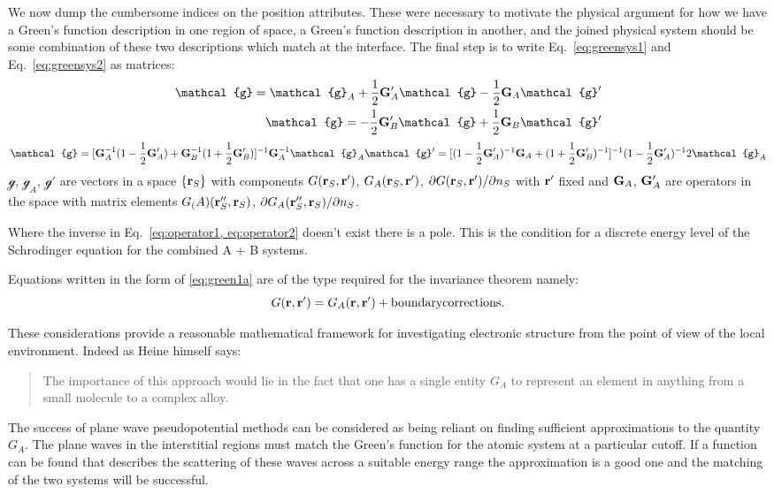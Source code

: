 \documentclass{article}
\def\G{{\bf G}}
\def\r{{\bf r}}
\def\g{\mathcal{g}}
\begin{document}
We now dump the cumbersome indices on the position attributes. These
were necessary to motivate the physical argument for how we have a Green's function
description in one region of space, a Green's function description in another, 
and the joined physical system should be some combination of these two descriptions
which match at the interface. The final step is to write Eq.~\ref{eq:greensys1} 
and Eq.~\ref{eq:greensys2} as matrices:
%
\begin{eqnarray}
\label{eq:operator1}
\g = \g_{A} + \frac{1}{2}\G'_{A}\g - \frac{1}{2}\G_{A}\g' \\
\g = -\frac{1}{2}\G'_{B}\g + \frac{1}{2}\G_{B}\g' \\
\end{eqnarray}
%
\begin{eqnarray}
\label{eq:operator2}
\g = [\G^{-1}_{A}(1-\frac{1}{2}\G'_{A}) + \G^{-1}_{B}(1+\frac{1}{2}\G'_{B})]^{-1} \G^{-1}_{A}\g_{A}
\g'= [(1-\frac{1}{2}\G'_{A})^{-1}\G_{A} + (1+\frac{1}{2}\G'_{B})^{-1}]^{-1}(1 - \frac{1}{2}\G'_{A})^{-1}2\g_{A}
\end{eqnarray}
%
$\g$, $\g_{A}$, $\g'$ are vectors in a space $\{\r_{S}\}$ with components $G(\r_{S},\r')$,
$G_{A}(\r_{S},\r')$, $\partial G(\r_{S},\r')/\partial n_{S}$ with $\r'$ fixed and
$\G_{A}$, $\G'_{A}$ are operators in the space with matrix elements
$G_(A)(\r''_{S}, \r_{S})$, $\partial G_{A}(\r''_{S}, \r_{S})/\partial n_{S}$.

Where the inverse in Eq.~\ref{eq:operator1, eq:operator2} 
doesn't exist there is a pole. This is the condition for a discrete energy level 
of the Schrodinger equation for the combined A + B systems. 

Equations written in the form of \ref{eq:green1a} are of the type required for the invariance theorem namely:
%
\begin{equation}
G(\r,\r') = G_{A}(\r,\r') + {\rm boundary corrections}.
\end{equation}
%

These considerations provide a reasonable mathematical framework for 
investigating electronic structure from the point of view of the local environment.
Indeed as Heine himself says: 

\begin{quote}
The importance of this approach would lie in the fact that
one has a single entity $G_{A}$ to represent an element in anything 
from a small molecule to a complex alloy.
\end{quote}

The success of plane wave pseudopotential methods can be considered as being reliant
on finding sufficient approximations to the quantity $G_{A}$. The plane waves
in the interstitial regions must match the Green's function for the atomic system
at a particular cutoff. If a function can be found that describes the scattering of
these waves across a suitable energy range the approximation is a good one and the matching
of the two systems will be successful.
\end{document}
